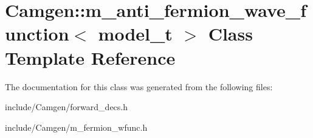 \hypertarget{a00335}{}\section{Camgen\+:\+:m\+\_\+anti\+\_\+fermion\+\_\+wave\+\_\+function$<$ model\+\_\+t $>$ Class Template Reference}
\label{a00335}


The documentation for this class was generated from the following files\+:\begin{DoxyCompactItemize}
\item 
include/\+Camgen/forward\+\_\+decs.\+h\item 
include/\+Camgen/m\+\_\+fermion\+\_\+wfunc.\+h\end{DoxyCompactItemize}
